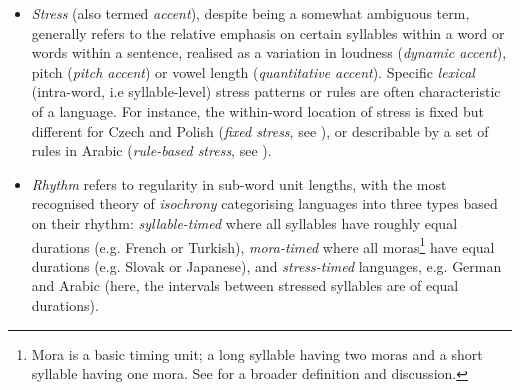 \documentclass[bsc,frontabs,twoside,singlespacing,parskip,deptreport]{infthesis}
\begin{document}
{{{\begin{itemize}
        \item {\textit{Stress} (also termed \textit{accent}), despite being a somewhat ambiguous term, generally refers to the relative emphasis on certain syllables within a word or words within a sentence, realised as a variation in loudness (\textit{dynamic accent}), pitch (\textit{pitch accent}) or vowel length (\textit{quantitative accent}). Specific \textit{lexical} (intra-word, i.e syllable-level) stress patterns or rules are often characteristic of a language. For instance, the within-word location of stress is fixed but different for Czech and Polish (\textit{fixed stress}, see \citet{WALS_14}), or describable by a set of rules in Arabic (\textit{rule-based stress}, see \citet{WALS_15}).}
        \item {\textit{Rhythm} refers to regularity in sub-word unit lengths, with the most recognised theory of \textit{isochrony} categorising languages into three types based on their rhythm: \textit{syllable-timed} where all syllables have roughly equal durations (e.g. French or Turkish), \textit{mora-timed} where all moras\footnote{Mora is a basic timing unit; a long syllable having two moras and a short syllable having one mora. See \citet[p. 312]{Crystal_2008} for a broader definition and discussion.} have equal durations (e.g. Slovak or Japanese), and \textit{stress-timed} languages, e.g. German and Arabic (here, the intervals between stressed syllables are of equal durations).}
      \end{itemize}


}}}
\end{document}
